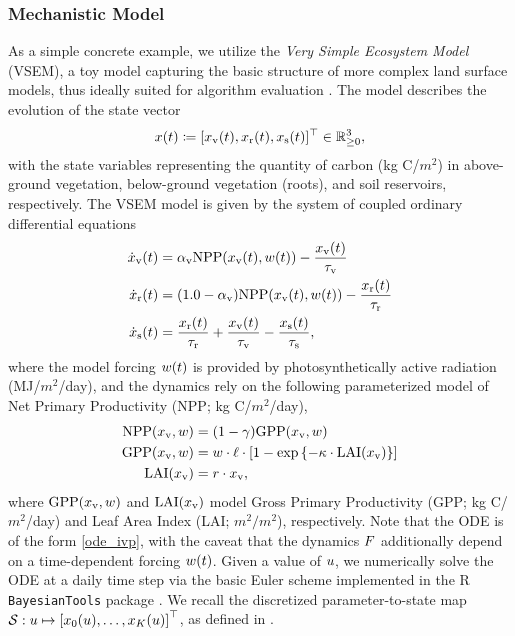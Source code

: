 \documentclass[12pt]{article}
\begin{document}
\subsubsection{Mechanistic Model}
As a simple concrete example, we utilize the \textit{Very Simple Ecosystem Model} (VSEM), a toy model capturing the basic 
structure of more complex land surface models, thus ideally suited for algorithm evaluation \citep{vsem}. The model 
describes the evolution of the state vector
\begin{align*}
\state(\Time) \Def [\stateV(\Time), \stateR(\Time), \stateS(\Time)]^\top \in \R_{\geq 0}^{3}, 
\end{align*}
with the state variables representing the quantity of carbon (\textrm{kg C/$m^2$}) in above-ground vegetation, below-ground 
vegetation (roots), and soil reservoirs, respectively. The VSEM model is given by the system of coupled 
ordinary differential equations
\begin{align}
\dstateV(\Time) &= \alphaV \NPP(\stateV(\Time), \forcing(\Time)) - \frac{\stateV(\Time)}{\tauV} \\
\dstateR(\Time) &= (1.0 - \alphaV) \NPP(\stateV(\Time), \forcing(\Time)) - \frac{\stateR(\Time)}{\tauR} \nonumber \\ 
\dstateS(\Time) &= \frac{\stateR(\Time)}{\tauR} + \frac{\stateV(\Time)}{\tauV} - \frac{\stateS(\Time)}{\tauS}, \nonumber
\end{align}
where the model forcing $\forcing(\Time)$ is provided by photosynthetically active radiation 
(\textrm{MJ/$m^2$/day}), and the dynamics rely on the following parameterized model of 
Net Primary Productivity (NPP; \textrm{kg C/$m^2$/day}),
\begin{align}
\NPP(\stateV, \forcing) &= (1 - \fracRespiration) \GPP(\stateV, \forcing) \\
\GPP(\stateV, \forcing) &= \forcing \cdot \LUE \cdot \left[1 - \exp\left\{-\KEXT \cdot \LAI(\stateV) \right\} \right] \nonumber \\
\LAI(\stateV) &= \LAR \cdot \stateV, \nonumber
\end{align} 
where $\GPP(\stateV, \forcing)$ and $\LAI(\stateV)$ model Gross Primary Productivity (GPP; \textrm{kg C/$m^2$/day})
and Leaf Area Index (LAI; \textrm{$m^2/m^2$}), respectively.
Note that the ODE is of the form \ref{ode_ivp}, with the caveat that the dynamics $\odeRHS$ additionally depend on a 
time-dependent forcing $\forcing(\Time)$. Given a value of $\Par$, we numerically solve the ODE at a daily time step
via the basic Euler scheme implemented in the R \verb+BayesianTools+ package \citep{vsem}. We recall the discretized 
parameter-to-state map 
$\solutionOp: \Par \mapsto \left[\indexTime[0]{\state}(\Par), \dots, \indexTime[\NTimeStep]{\state}(\Par) \right]^\top$, 
as defined in .
\end{document}
